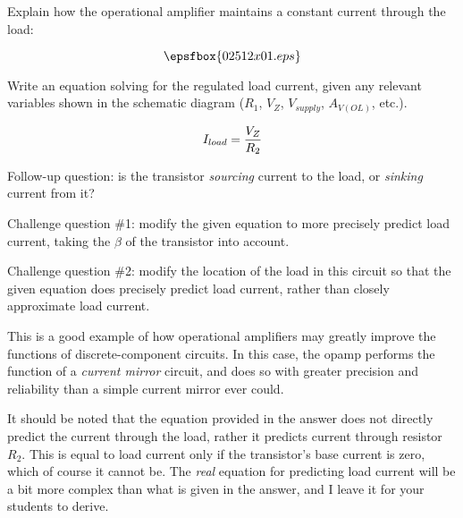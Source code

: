

Explain how the operational amplifier maintains a constant current through the load:

$$\epsfbox{02512x01.eps}$$

Write an equation solving for the regulated load current, given any relevant variables shown in the schematic diagram ($R_1$, $V_Z$, $V_{supply}$, $A_{V(OL)}$, etc.).







$$I_{load} = {V_Z \over R_2}$$

\vskip 10pt

Follow-up question: is the transistor {\it sourcing} current to the load, or {\it sinking} current from it?

\vskip 10pt

Challenge question \#1: modify the given equation to more precisely predict load current, taking the $\beta$ of the transistor into account.

\vskip 10pt

Challenge question \#2: modify the location of the load in this circuit so that the given equation does precisely predict load current, rather than closely approximate load current.







This is a good example of how operational amplifiers may greatly improve the functions of discrete-component circuits.  In this case, the opamp performs the function of a {\it current mirror} circuit, and does so with greater precision and reliability than a simple current mirror ever could.

It should be noted that the equation provided in the answer does not directly predict the current through the load, rather it predicts current through resistor $R_2$.  This is equal to load current only if the transistor's base current is zero, which of course it cannot be.  The {\it real} equation for predicting load current will be a bit more complex than what is given in the answer, and I leave it for your students to derive.




